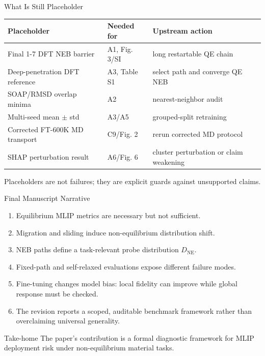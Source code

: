 \documentclass[aspectratio=169,10pt]{beamer}
\newcommand{\Dne}{D_{\mathrm{NE}}}
\begin{document}
\begin{frame}{What Is Still Placeholder}
  \begin{table}
  \centering
  \small
  \begin{tabular}{lll}
  \toprule
  Placeholder & Needed for & Upstream action \\
  \midrule
  Final 1-7 DFT NEB barrier & A1, Fig. 3/SI & long restartable QE chain \\
  Deep-penetration DFT reference & A3, Table S1 & select path and converge QE NEB \\
  SOAP/RMSD overlap minima & A2 & nearest-neighbor audit \\
  Multi-seed mean $\pm$ std & A3/A5 & grouped-split retraining \\
  Corrected FT-600K MD transport & C9/Fig. 2 & rerun corrected MD protocol \\
  SHAP perturbation result & A6/Fig. 6 & cluster perturbation or claim weakening \\
  \bottomrule
  \end{tabular}
  \end{table}

  \vspace{0.2cm}
  Placeholders are not failures; they are explicit guards against unsupported claims.
\end{frame}

\begin{frame}{Final Manuscript Narrative}
  \begin{enumerate}
    \item Equilibrium MLIP metrics are necessary but not sufficient.
    \item Migration and sliding induce non-equilibrium distribution shift.
    \item NEB paths define a task-relevant probe distribution $\Dne$.
    \item Fixed-path and self-relaxed evaluations expose different failure modes.
    \item Fine-tuning changes model bias: local fidelity can improve while global response must be checked.
    \item The revision reports a scoped, auditable benchmark framework rather than overclaiming universal generality.
  \end{enumerate}

  \vspace{0.25cm}
  \begin{block}{Take-home}
  The paper's contribution is a formal diagnostic framework for MLIP deployment risk under non-equilibrium material tasks.
  \end{block}
\end{frame}
\end{document}
